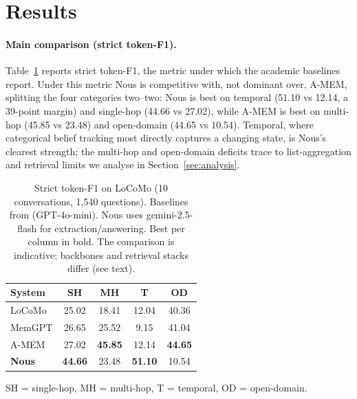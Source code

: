 \documentclass[11pt,a4paper,twocolumn]{article}
\begin{document}
\section{Results}
\label{sec:results}

\paragraph{Main comparison (strict token-F1).}
Table~\ref{tab:main} reports strict token-F1, the metric under which the
academic baselines report. Under this metric Nous is competitive with, not
dominant over, A-MEM, splitting the four categories two--two: Nous is best on
temporal (51.10 vs 12.14, a 39-point margin) and single-hop (44.66 vs 27.02),
while A-MEM is best on multi-hop (45.85 vs 23.48) and open-domain (44.65 vs
10.54). Temporal, where categorical belief tracking most directly captures a
changing state, is Nous's clearest strength; the multi-hop and open-domain
deficits trace to list-aggregation and retrieval limits we analyse in
Section~\ref{sec:analysis}.

\begin{table}[t]
\centering
\caption{Strict token-F1 on LoCoMo (10 conversations, 1,540 questions).
Baselines from \citet{xu2025amem} (GPT-4o-mini). Nous uses gemini-2.5-flash
for extraction/answering. Best per column in bold. The comparison is
indicative: backbones and retrieval stacks differ (see text).}
\label{tab:main}
\renewcommand{\arraystretch}{1.25}
\setlength{\tabcolsep}{4pt}
\begin{tabular}{lcccc}
\toprule
System & SH & MH & T & OD \\
\midrule
LoCoMo       & 25.02 & 18.41 & 12.04 & 40.36 \\
MemGPT       & 26.65 & 25.52 & 9.15  & 41.04 \\
A-MEM        & 27.02 & \textbf{45.85} & 12.14 & \textbf{44.65} \\
\midrule
\textbf{Nous}& \textbf{44.66} & 23.48 & \textbf{51.10} & 10.54 \\
\bottomrule
\end{tabular}
\end{table}

SH = single-hop, MH = multi-hop, T = temporal, OD = open-domain.
\end{document}
